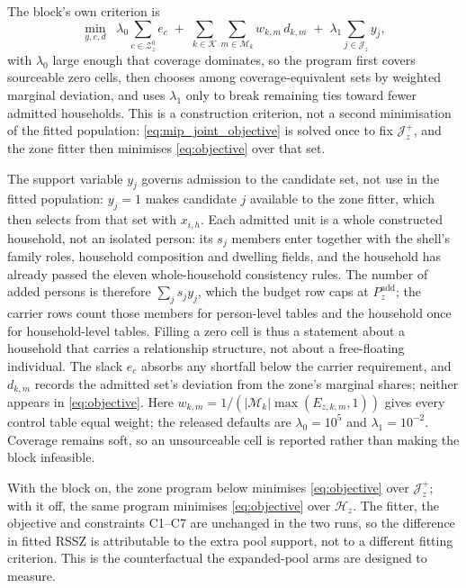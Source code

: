 The block's own criterion is
\begin{equation}
\min_{y,e,d}\;\;
\lambda_0\sum_{c\in\mathcal{Z}_z^0} e_c
\;+\;\sum_{k\in\mathcal{K}}\sum_{m\in\mathcal{M}_k} w_{k,m}\,d_{k,m}
\;+\;\lambda_1\sum_{j\in\mathcal{J}_z} y_j ,
\label{eq:mip_joint_objective}
\end{equation}
with $\lambda_0$ large enough that coverage dominates, so the program first
covers sourceable zero cells, then chooses among coverage-equivalent sets by
weighted marginal deviation, and uses $\lambda_1$ only to break remaining ties
toward fewer admitted households. This is a construction criterion, not a second
minimisation of the fitted population: \eqref{eq:mip_joint_objective} is solved
once to fix \(\mathcal{J}_z^{+}\), and the zone fitter then minimises
\eqref{eq:objective} over that set.

The support variable \(y_j\) governs admission to the candidate set, not use in
the fitted population: \(y_j=1\) makes candidate \(j\) available to the zone
fitter, which then selects from that set with \(x_{i,h}\). Each admitted unit is
a whole constructed household, not an isolated person: its \(s_j\) members enter
together with the shell's family roles, household composition and dwelling
fields, and the household has already passed the eleven whole-household consistency rules.
The number of added persons is therefore \(\sum_j s_j y_j\), which the budget row
caps at \(P_z^{\mathrm{add}}\); the carrier rows count those members for
person-level tables and the household once for household-level tables. Filling a
zero cell is thus a statement about a household that carries a relationship
structure, not about a free-floating individual. The slack \(e_c\)
absorbs any shortfall below the carrier requirement, and \(d_{k,m}\) records the
admitted set's deviation from the zone's marginal shares; neither appears in
\eqref{eq:objective}. Here
$w_{k,m}=1/(|\mathcal{M}_k|\max(E_{z,k,m},1))$ gives every control table equal
weight; the released defaults are $\lambda_0=10^5$ and $\lambda_1=10^{-2}$.
Coverage remains soft, so an unsourceable cell is reported rather than making
the block infeasible.

With the block on, the zone program below minimises \eqref{eq:objective} over
\(\mathcal{J}_z^{+}\); with it off, the same program minimises \eqref{eq:objective}
over \(\mathcal{H}_z\). The fitter, the objective and constraints C1--C7 are
unchanged in the two runs, so the difference in fitted RSSZ is attributable to
the extra pool support, not to a different fitting criterion. This is the
counterfactual the expanded-pool arms are designed to measure.

